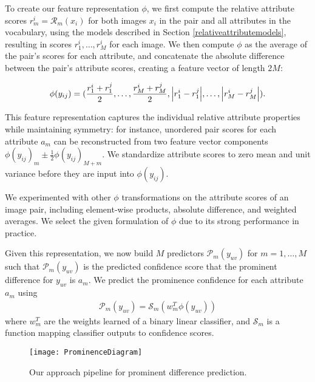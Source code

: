 \documentclass[10pt,twocolumn,letterpaper]{article}
\begin{document}
To create our feature representation $\phi$, we first compute the relative attribute scores $r_m^i = \mathcal{R}_m(x_i)$ for both images $x_i$ in the pair and all attributes in the vocabulary, using the models described in Section \ref{relativeattributemodels}, resulting in scores $r_1^i, \dotsc, r_M^i$ for each image. We then compute $\phi$ as the average of the pair's scores for each attribute, and concatenate the absolute difference between the pair's attribute scores, creating a feature vector of length $2M$:

{\footnotesize
\begin{align}
    \phi(y_{ij}) = (\frac{r_1^i + r_1^j}{2}, \dotsc, \frac{r_M^i + r_M^j}{2}, \abs{r_1^i - r_1^j}, \dotsc, \abs{r_M^i - r_M^j}).
\end{align}
}%

This feature representation captures the individual relative attribute properties while maintaining symmetry: for instance, unordered pair scores for each attribute $a_m$ can be reconstructed from two feature vector components $\phi(y_{ij})_m \pm \frac{1}{2} \phi(y_{ij})_{M+m}$. We standardize attribute scores to zero mean and unit variance before they are input into $\phi(y_{ij})$.

We experimented with other $\phi$ transformations on the attribute scores of an image pair, including element-wise products, absolute difference, and weighted averages. We select the given formulation of $\phi$ due to its strong performance in practice.

Given this representation, we now build $M$ predictors $\mathcal{P}_m(y_{uv})$ for $m = 1, \dotsc, M$ such that $\mathcal{P}_m(y_{uv})$ is the predicted confidence score that the prominent difference for $y_{uv}$ is $a_m$. We predict the prominence confidence for each attribute $a_m$ using
\begin{align}
    \mathcal{P}_m(y_{uv}) = \mathcal{S}_m (w_m^T \phi(y_{uv}))
\end{align}
where $w_m^T$ are the weights learned of a binary linear classifier, and $\mathcal{S}_m$ is a function mapping classifier outputs to confidence scores.

\begin{figure}[t]
    \centering
    \texttt{[image: ProminenceDiagram]}
    \caption[Pipeline for Prominent Difference Prediction]{Our approach pipeline for prominent difference prediction.}
    \label{fig:pipeline}
\end{figure}
\end{document}
